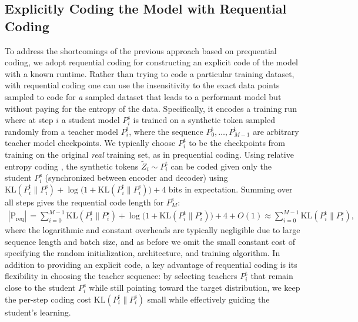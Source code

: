 \documentclass[twoside]{article}
\begin{document}
\subsection{Explicitly Coding the Model with Requential Coding}
To address the shortcomings of the previous approach based on prequential coding, we adopt requential coding \citep{finzi2026requential} for constructing an explicit code of the model with a known runtime. Rather than trying to code a particular training dataset, with requential coding one can use the insensitivity to the exact data points sampled to code for \emph{a} sampled dataset that leads to a performant model but without paying for the entropy of the data. Specifically, it encodes a training run where at step $i$ a student model $P^{\mathrm{s}}_i$ is trained on a synthetic token sampled randomly from a teacher model $P^{\mathrm{t}}_i$, where the sequence $P^{\mathrm{t}}_0, \ldots, P^{\mathrm{t}}_{M-1}$ are arbitrary teacher model checkpoints. We typically choose $P^{\mathrm{t}}_i$ to be the checkpoints from training on the original \emph{real} training set, as in prequential coding. Using relative entropy coding \citep{theis2022algorithms}, the synthetic tokens $\widetilde{Z}_i \sim P^{\mathrm{t}}_i$ can be coded given only the student $P^{\mathrm{s}}_i$ (synchronized between encoder and decoder) using $\mathrm{KL}(P^{\mathrm{t}}_i\|P^{\mathrm{s}}_i) + \log\bigl(1+\mathrm{KL}(P^{\mathrm{t}}_i\|P^{\mathrm{s}}_i)\bigr) + 4$ bits in expectation.
Summing over all steps gives the requential code length for $P^{\mathrm{s}}_M$:
\begin{align}
|\mathrm{P}_{\mathrm{req}}|\,
= \sum_{i=0}^{M-1} \mathrm{KL}(P^{\mathrm{t}}_i\|P^{\mathrm{s}}_i) + \log\bigl(1+\mathrm{KL}(P^{\mathrm{t}}_i\|P^{\mathrm{s}}_i)\bigr) + 4 + O(1)
\approx \sum_{i=0}^{M-1} \mathrm{KL}(P^{\mathrm{t}}_i\|P^{\mathrm{s}}_i),
\end{align}
where the logarithmic and constant overheads are typically negligible due to large sequence length and batch size, and as before we omit the small constant cost of specifying the random initialization, architecture, and training algorithm. In addition to providing an explicit code, a key advantage of requential coding is its flexibility in choosing the teacher sequence: by selecting teachers $P^{\mathrm{t}}_i$ that remain close to the student $P^{\mathrm{s}}_i$ while still pointing toward the target distribution, we keep the per-step coding cost $\mathrm{KL}(P^{\mathrm{t}}_i\|P^{\mathrm{s}}_i)$ small while effectively guiding the student's learning.
\end{document}
